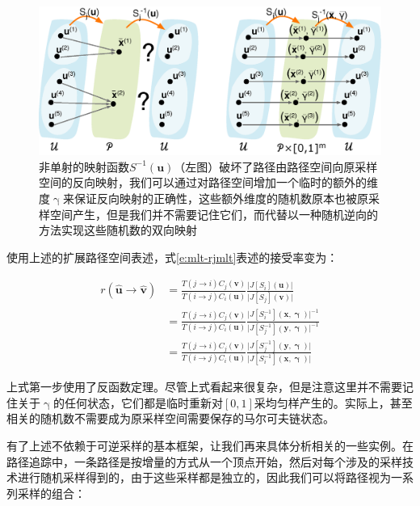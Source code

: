 \begin{figure}
	\includegraphics[width=1.\textwidth]{figures/mlt/non-injective}
	\caption{非单射的映射函数$S^{-1}(\mathbf{u})$（左图）破坏了路径由路径空间向原采样空间的反向映射，我们可以通过对路径空间增加一个临时的额外的维度${\upgamma}$来保证反向映射的正确性，这些额外维度的随机数原本也被原采样空间产生，但是我们并不需要记住它们，而代替以一种随机逆向的方法实现这些随机数的双向映射}
	\label{f:mlt-non-injective}
\end{figure}

使用上述的扩展路径空间表述，式\ref{e:mlt-rjmlt}表述的接受率变为：

\begin{equation}\label{e:mlt-rjmlt-general}
\begin{aligned}
	r(\hat{\mathbf{u}}\to\hat{\mathbf{v}})&=\frac{T(j\to i)C_j({\mathbf{v}})}{T(i\to j)C_i({\mathbf{u}})}\frac{\big|J[S_i]({\mathbf{u}})\big|}{\big|J[S_j]({\mathbf{v}})\big|}\\
	&=\frac{T(j\to i)C_j({\mathbf{v}})}{T(i\to j)C_i({\mathbf{u}})}\frac{\big|J[S^{-1}_i]({\mathbf{x}},{\mathbf{\upgamma}})\big|^{-1}}{\big|J[S^{-1}_j]({\mathbf{y}},{\mathbf{\upgamma}})\big|^{-1}}\\
	&=\frac{T(j\to i)C_j({\mathbf{v}})}{T(i\to j)C_i({\mathbf{u}})}\frac{\big|J[S^{-1}_j]({\mathbf{y}},{\mathbf{\upgamma}})\big|}{\big|J[S^{-1}_i]({\mathbf{x}},{\mathbf{\upgamma}})\big|}
\end{aligned}
\end{equation}

\noindent 上式第一步使用了反函数定理。尽管上式看起来很复杂，但是注意这里并不需要记住关于${\upgamma}$的任何状态，它们都是临时重新对$[0,1]$采均匀样产生的。实际上，甚至相关的随机数不需要成为原采样空间需要保存的马尔可夫链状态。

有了上述不依赖于可逆采样的基本框架，让我们再来具体分析相关的一些实例。在路径追踪中，一条路径是按增量的方式从一个顶点开始，然后对每个涉及的采样技术进行随机采样得到的，由于这些采样都是独立的，因此我们可以将路径视为一系列采样的组合：

